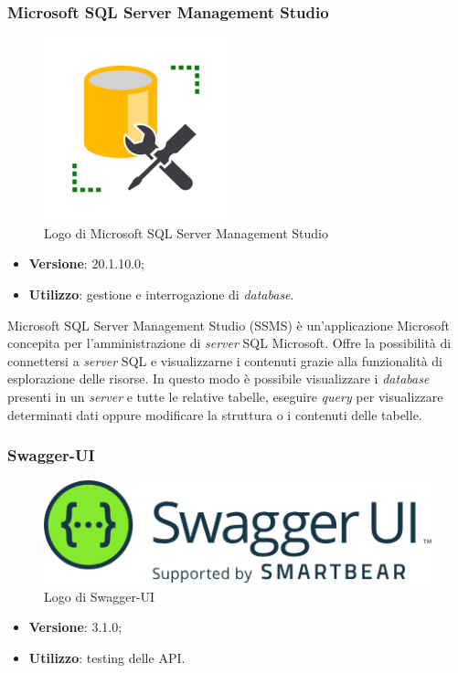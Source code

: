 \subsubsection{Microsoft SQL Server Management Studio}

\begin{figure}[H]
    \centering 
    \includegraphics[width=0.25\columnwidth]{images/loghi/sql_server.png} 
    \caption{Logo di Microsoft SQL Server Management Studio}
\end{figure}

\begin{itemize}
    \item \textbf{Versione}: 20.1.10.0;
    \item \textbf{Utilizzo}: gestione e interrogazione di \textit{database}.
\end{itemize}

\noindent Microsoft SQL Server Management Studio (SSMS) è un'applicazione Microsoft concepita per l'amministrazione di \textit{server} SQL Microsoft. Offre la possibilità di connettersi a \textit{server} SQL e visualizzarne i contenuti grazie alla funzionalità di esplorazione delle risorse. In questo modo è possibile visualizzare i \textit{database} presenti in un \textit{server} e tutte le relative tabelle, eseguire \textit{query} per visualizzare determinati dati oppure modificare la struttura o i contenuti delle tabelle.

\subsubsection{Swagger-UI}

\begin{figure}[H]
    \centering 
    \includegraphics[width=0.4\columnwidth]{images/loghi/swagger.png} 
    \caption{Logo di Swagger-UI}
\end{figure}

\begin{itemize}
    \item \textbf{Versione}: 3.1.0;
    \item \textbf{Utilizzo}: testing delle API.
\end{itemize}

